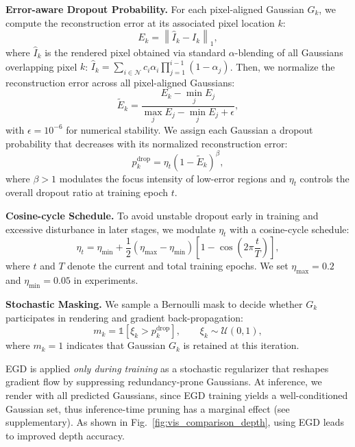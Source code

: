 \documentclass[runningheads]{llncs}
\begin{document}
\noindent
\textbf{Error-aware Dropout Probability.}
For each pixel-aligned Gaussian $G_k$, we compute the reconstruction error at its associated pixel location $k$: 
\begin{equation}
    E_k = \left\| \hat{I}_k - I_k \right\|_1 ,
\end{equation}
where $\hat{I}_k$ is the rendered pixel obtained via standard $\alpha$-blending of all Gaussians overlapping pixel $k$: $\hat{I}_k = \sum_{i \in \mathcal{N}} {c}_i \alpha_i \prod_{j=1}^{i-1} (1 - \alpha_j)$. 
Then, we normalize the reconstruction error across all pixel-aligned Gaussians: 
\begin{equation}
    \tilde{E}_k = 
    \frac{E_k - \min_j E_j}{\max_j E_j - \min_j E_j + \epsilon}, 
    \label{eq:egd_error_norm}
\end{equation}
with $\epsilon = 10^{-6}$ for numerical stability. 
We assign each Gaussian a dropout probability that decreases with its normalized reconstruction error:
\begin{equation}
    p_k^{\text{drop}} = {\eta}_t \left( 1 - \tilde{E}_k \right)^{\beta},
    \label{eq:egd_probability}
\end{equation}
where $\beta>1$ modulates the focus intensity of low-error regions and $\eta_t$ controls the overall dropout ratio at training epoch $t$. 


\noindent
\textbf{Cosine-cycle Schedule.}
To avoid unstable dropout early in training and excessive disturbance in later stages, we modulate $\eta_t$ with a cosine-cycle schedule: 
\begin{equation}
\eta_t = \eta_{\min} + \frac{1}{2}(\eta_{\max} - \eta_{\min})
\left[1 - \cos\!\left(2\pi \frac{t}{T}\right)\right],
\label{eq:cosine_cycle}
\end{equation}
where $t$ and $T$ denote the current and total training epochs. 
We set $\eta_{\max}=0.2$ and $\eta_{\min}=0.05$ in experiments. 

\noindent
\textbf{Stochastic Masking.}
We sample a Bernoulli mask to decide whether $G_k$ participates in rendering and gradient back-propagation:
\begin{equation}
    m_k = \mathds{1}\!\left[\xi_k > p_k^{\text{drop}}\right],
    \qquad 
    \xi_k \sim \mathcal{U}(0,1),
\end{equation}
where $m_k=1$ indicates that Gaussian $G_k$ is retained at this iteration.


EGD is applied \emph{only during training} as a stochastic regularizer that reshapes gradient flow by suppressing redundancy-prone Gaussians. 
At inference, we render with all predicted Gaussians, since EGD training yields a well-conditioned Gaussian set, thus inference-time pruning has a marginal effect (see supplementary). 
As shown in Fig.~\ref{fig:vis_comparison_depth}, using EGD leads to improved depth accuracy. 
\end{document}
